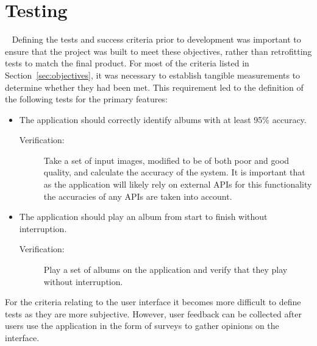 \section{Testing}~\label{sec:test-design}
Defining the tests and success criteria prior to development was important to ensure that the project was built to meet these objectives, rather than retrofitting tests to match the final product. For most of the criteria listed in Section~\ref{sec:objectives}, it was necessary to establish tangible measurements to determine whether they had been met. This requirement led to the definition of the following tests for the primary features:
\begin{itemize}
    \item The application should correctly identify albums with at least 95\% accuracy.
    \begin{description}
        \item[Verification:] Take a set of input images, modified to be of both poor and good quality, and calculate the accuracy of the system. It is important that as the application will likely rely on external APIs for this functionality the accuracies of any APIs are taken into account.
    \end{description}
    \item The application should play an album from start to finish without interruption.
    \begin{description}
        \item[Verification:] Play a set of albums on the application and verify that they play without interruption.
    \end{description}
\end{itemize}

For the criteria relating to the user interface it becomes more difficult to define tests as they are more subjective. However, user feedback can be collected after users use the application in the form of surveys to gather opinions on the interface.

